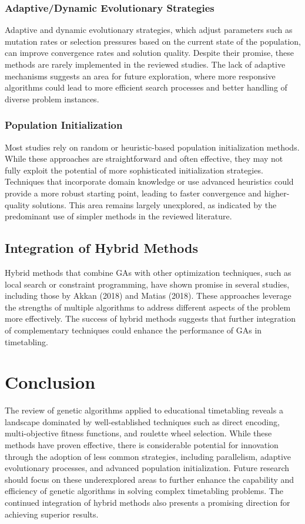\documentclass[sigconf]{acmart}
\begin{document}
\subsubsection{Adaptive/Dynamic Evolutionary Strategies}
Adaptive and dynamic evolutionary strategies, which adjust parameters such as
mutation rates or selection pressures based on the current state of the
population, can improve convergence rates and solution quality.
Despite their promise, these methods are rarely implemented in the reviewed
studies. The lack of adaptive mechanisms suggests an area for future
exploration, where more responsive algorithms could lead to more efficient
search processes and better handling of diverse problem instances.

\subsubsection{Population Initialization}
Most studies rely on random or heuristic-based population initialization
methods. While these approaches are straightforward and often effective, they
may not fully exploit the potential of more sophisticated initialization
strategies. Techniques that incorporate domain knowledge or use advanced
heuristics could provide a more robust starting point, leading to faster
convergence and higher-quality solutions. This area remains largely unexplored,
as indicated by the predominant use of simpler methods in the reviewed
literature.

\subsection{Integration of Hybrid Methods}
Hybrid methods that combine GAs with other optimization techniques, such as
local search or constraint programming, have shown promise in several studies,
including those by Akkan (2018) and Matias (2018). These approaches leverage
the strengths of multiple algorithms to address different aspects of the
problem more effectively. The success of hybrid methods suggests that further
integration of complementary techniques could enhance the performance of GAs
in timetabling.



\section{Conclusion}
The review of genetic algorithms applied to educational timetabling reveals a
landscape dominated by well-established techniques such as direct encoding,
multi-objective fitness functions, and roulette wheel selection. While these
methods have proven effective, there is considerable potential for innovation
through the adoption of less common strategies, including parallelism, adaptive
evolutionary processes, and advanced population initialization. Future research
should focus on these underexplored areas to further enhance the capability and
efficiency of genetic algorithms in solving complex timetabling problems.
The continued integration of hybrid methods also presents a promising direction
for achieving superior results.
\end{document}
